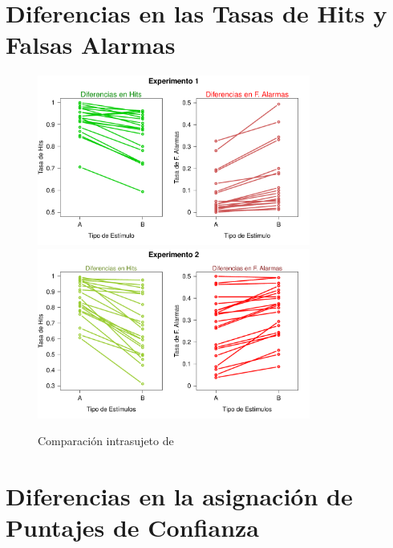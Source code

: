 \section{Diferencias en las Tasas de Hits y Falsas Alarmas}

\begin{figure}[th]
\centering
\includegraphics[width=0.80\textwidth]{Figures/Diff_Rate_E1}\\ 
\includegraphics[width=0.80\textwidth]{Figures/Diff_Rate_E2}
\caption[Diferencias en Tasas (Comprobando diferencias entre condiciones)]{Comparación intrasujeto de}
\label{fig:Diff_Rate}
\end{figure}

\section{Diferencias en la asignación de Puntajes de Confianza}



